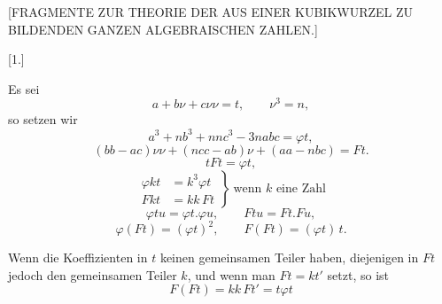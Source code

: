 \clearpage
{}
\begin{center}\large [FRAGMENTE ZUR THEORIE DER AUS EINER KUBIKWURZEL ZU BILDENDEN GANZEN ALGEBRAISCHEN ZAHLEN.]\end{center}

\begin{center}[1.]\end{center}\par\noindent\hspace*{\parindent}Es sei
\[
a+b\nu+c\nu\nu = t, \qquad \nu^3 = n,
\]
\noindent so setzen wir
\[
a^3+nb^3+nnc^3-3nabc = \varphi t,
\]
\[
(bb-ac)\nu\nu+(ncc-ab)\nu+(aa-nbc) = Ft.
\]
\noindent{}
\[
tFt = \varphi t,
\]
\[
\left.\begin{aligned}
\varphi kt &= k^3 \varphi t \\
Fkt &= kk\,Ft
\end{aligned}\right\}\ \text{wenn } k \text{ eine Zahl}
\]
\[
\varphi tu = \varphi t . \varphi u, \qquad Ftu = Ft . Fu,
\]
\[
\varphi(Ft) = (\varphi t)^2, \qquad F(Ft) = (\varphi t)\,t.
\]

Wenn die Koeffizienten in $t$ keinen gemeinsamen Teiler haben, diejenigen in $Ft$ jedoch den
gemeinsamen Teiler $k$, und wenn man $Ft = kt'$ setzt, so ist
\[
F(Ft) = kk\,Ft' = t\varphi t
\]%
